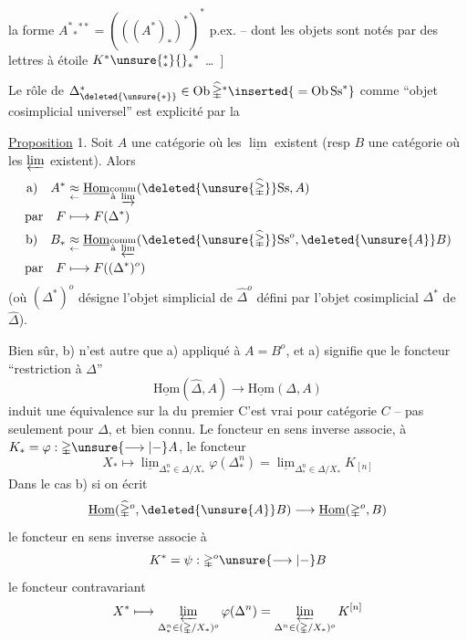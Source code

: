 la forme $A^*{}_*{}^{**}=(((A^*)_*)^*)^*$  p.ex. -- dont les objets sont notés  par des lettres à étoile $K^{*}\unsure{{}^{*}_{*}}{}_*{}^{*}$ \ldots\ ]

Le rôle de $\Delta^*_{\deleted{\unsure{*}}}\in\mathrm{Ob}\,\widehat{\mathbb{\Delta}}^*\inserted{{}=\mathrm{Ob}\,\mathrm{Ss}^*}$ comme ``objet cosimplicial universel'' est explicité par la

\uline{Proposition} 1. Soit $A$ une catégorie où les $\underline{\lim}$ existent (resp $B$ une catégorie où les $\varprojlim$ existent). Alors
\[
 \begin{aligned}
 \text{a)}\quad A^*&\underset{\leftarrow}{\approx}\underline{\mathrm{Hom}}_{\substack{\text{comm}\\\text{à }\varinjlim}}(\deleted{\unsure{\widehat{\mathbb{\Delta}}}}\mathrm{Ss},A)\\
 \text{par}\quad F&\longmapsto F(\Delta^*)\\
 \text{b)}\quad B_*&\underset{\leftarrow}{\approx}\underline{\mathrm{Hom}}_{\substack{\text{comm}\\\text{à }\varprojlim}}(\deleted{\unsure{\widehat{\mathbb{\Delta}}}}\mathrm{Ss}^{o},\deleted{\unsure{A}}B)\\
 \text{par}\quad F&\longmapsto F((\Delta^*)^o)
 \end{aligned}
\]
(où $(\Delta^*)^o$ désigne l'objet simplicial de $\widehat{\mathbb{\Delta}}^o$ défini par l'objet cosimplicial $\Delta^*$ de $\widehat{\mathbb{\Delta}}$).

Bien sûr, b) n'est autre que a) appliqué à $A=B^o$, et a) signifie que le foncteur ``restriction à $\mathbb{\Delta}$''
\[
 \underline{\mathrm{Hom}}(\widehat{\mathbb{\Delta}},A)\longrightarrow\underline{\mathrm{Hom}}(\mathbb{\Delta},A)
\]
induit une équivalence sur la    du premier  C'est vrai pour \uline{}   catégorie $C$ -- pas seulement pour $\mathbb{\Delta}$, et bien connu. Le foncteur en sens inverse associe, à $K_*=\varphi:\mathbb{\Delta}\unsure{\longrightarrow|-} A$, le foncteur
\[
 X_*\longmapsto
 \underline{\lim}_{\Delta^n_*\in\mathbb{\Delta}/X_*}\varphi(\Delta^n_*)
 =\underline{\lim}_{\Delta^n_*\in\mathbb{\Delta}/X_*}K_{[n]}
\]
Dans le cas b) si on écrit
\[
 \underline{\mathrm{Hom}}(\widehat{\mathbb{\Delta}}^o,\deleted{\unsure{A}}B)\longrightarrow
 \underline{\mathrm{Hom}}(\mathbb{\Delta}^o,B)
\]
le foncteur en sens inverse associe à
\[
 K^*=\psi:\mathbb{\Delta}^o\unsure{\longrightarrow|-}B
\]
le foncteur contravariant
\[
 X^*\longmapsto\varprojlim_{\Delta^n_*\in(\mathbb{\Delta}/X_*)^o}\varphi(\Delta^n)
 =\varprojlim_{\Delta^n\in(\mathbb{\Delta}/X_*)^o}K^{[n]}
\]

